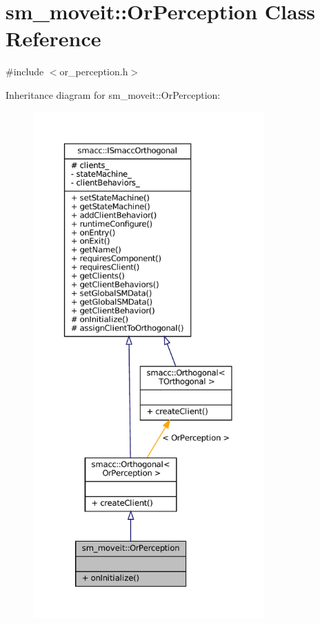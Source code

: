 \hypertarget{classsm__moveit_1_1OrPerception}{}\section{sm\+\_\+moveit\+:\+:Or\+Perception Class Reference}
\label{classsm__moveit_1_1OrPerception}


{\ttfamily \#include $<$or\+\_\+perception.\+h$>$}



Inheritance diagram for sm\+\_\+moveit\+:\+:Or\+Perception\+:
\nopagebreak
\begin{figure}[H]
\begin{center}
\leavevmode
\includegraphics[height=550pt]{classsm__moveit_1_1OrPerception__inherit__graph}
\end{center}
\end{figure}



